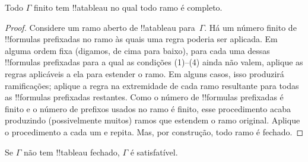 \documentclass[../../../include/open-logic-section]{subfiles}
\begin{document}
\begin{prop}
  Todo $\Gamma$ finito tem !!a{tableau} no qual todo ramo é completo.
\end{prop}

\begin{proof}
  Considere um ramo aberto de !!a{tableau} para~$\Gamma$. Há um número
  finito de !!{formula}s prefixadas no ramo às quais uma regra poderia
  ser aplicada. Em alguma ordem fixa (digamos, de cima para baixo), para
  cada uma dessas !!{formula}s prefixadas para a qual as condições
  (1)--(4) ainda não valem, aplique as regras aplicáveis a ela para
  estender o ramo. Em alguns casos, isso produzirá ramificações; aplique
  a regra na extremidade de cada ramo resultante para todas as !!{formula}s
  prefixadas restantes. Como o número de !!{formula}s prefixadas é finito
  e o número de prefixos usados no ramo é finito, esse procedimento acaba
  produzindo (possivelmente muitos) ramos que estendem o ramo original.
  Aplique o procedimento a cada um e repita. Mas, por construção, todo
  ramo é fechado.
\end{proof}

\begin{thm}[Completude]
  Se $\Gamma$ não tem !!{tableau} fechado, $\Gamma$ é satisfatível.
\end{thm}
\end{document}
